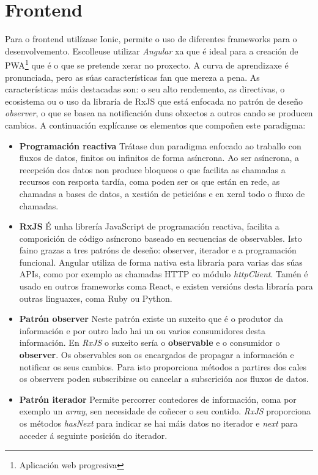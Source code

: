 \section{Frontend}
Para o frontend utilízase Ionic, permite o uso de diferentes frameworks para o desenvolvemento. Escolleuse utilizar \textit{Angular} xa que é ideal para a creación de \acrfull{PWA}\footnote{Aplicación web progresiva} que é o que se pretende xerar no proxecto. A curva de aprendizaxe é pronunciada, pero as súas características fan que mereza a pena. As características máis destacadas son: o seu alto rendemento, as directivas, o ecosistema ou o uso da libraría de \acrfull{RxJS} que está enfocada no patrón de deseño \textit{observer}, o que se basea na notificación duns obxectos a outros cando se producen cambios. A continuación explícanse os elementos que compoñen este paradigma:
\begin{itemize}
	\item \textbf{Programación reactiva}\smallbreak
		Trátase dun paradigma enfocado ao traballo con fluxos de datos, finitos ou infinitos de forma asíncrona. Ao ser asíncrona, a recepción dos datos non produce bloqueos o que facilita as chamadas a recursos con resposta tardía, coma poden ser os que están en rede, as chamadas a bases de datos, a xestión de peticións e en xeral todo o fluxo de chamadas.

	\item \textbf{RxJS}\smallbreak
		É unha librería JavaScript de programación reactiva, facilita a composición de código asíncrono baseado en secuencias de observables. Isto faino grazas a tres patróns de deseño: observer, iterador e a programación funcional. Angular utiliza de forma nativa esta libraría para varias das súas APIs, como por exemplo as chamadas \acrshort{HTTP} co módulo \textit{httpClient}. Tamén é usado en outros frameworks coma React, e existen versións desta libraría para outras linguaxes, coma Ruby ou Python.

	\item \textbf{Patrón observer}\smallbreak
		Neste patrón existe un suxeito que é o produtor da información e por outro lado hai un ou varios consumidores desta información. En \textit{\acrshort{RxJS}} o suxeito sería o \textbf{observable} e o consumidor o \textbf{observer}. Os observables son os encargados de propagar a información e notificar os seus cambios. Para isto proporciona métodos a partires dos cales os observers poden subscribirse ou cancelar a subscrición aos fluxos de datos.

	\item \textbf{Patrón iterador}\smallbreak
		Permite percorrer contedores de información, coma por exemplo un \textit{array}, sen necesidade de coñecer o seu contido. \textit{\acrshort{RxJS}} proporciona os métodos \textit{hasNext} para indicar se hai máis datos no iterador e \textit{next} para acceder á seguinte posición do iterador.


\end{itemize}
